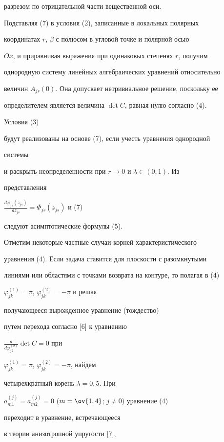 разрезом по отрицательной части вещественной оси. 


 


Подставляя (7) в условия (2), записанные в локальных полярных 


координатах $r$, $\beta$ с полюсом в угловой точке и полярной осью 


$O x$, и приравнивая выражения при одинаковых степенях $r$, получим 


однородную систему линейных алгебраических уравнений относительно 


величин $A_{js}(0)$. Она допускает нетривиальное решение, поскольку ее 


определителем является величина $\det C$, равная нулю согласно (4). 


Условия (3) 


будут реализованы на основе (7), если учесть уравнения однородной 


системы 


и раскрыть неопределенности при $r\to0$ и $\lambda\in(0,1)$. Из 


представления 


$\frac{d\varphi_{js}(z_{js})}{d z_{js}}=\Phi_{js}(z_{js})$ и (7) 


следуют асимптотические формулы (5). 


 


Отметим некоторые частные случаи корней характеристического 


уравнения (4). Если задача ставится для плоскости с разомкнутыми 


линиями или областями с точками возврата на контуре, то полагая в (4) 


$\varphi^{(1)}_{jk}=\pi$, $\varphi^{(2)}_{jk}=-\pi$ и решая 


получающееся вырожденное уравнение (тождество) 


путем перехода согласно [6] к уравнению 


$\frac{d}{d\varphi^{(2)}_{jk}}\det C=0$ при 


$\varphi^{(1)}_{jk}=\pi$, $\varphi^{(2)}_{jk}=-\pi$, найдем 


четырехкратный корень $\lambda=0,5$. При 


$a^{(j)}_{m1}=a^{(j)}_{m2}=0$ ($m=\ov{1,4}$; $j\ne0$) уравнение (4) 


переходит в уравнение, встречающееся 


в теории анизотропной упругости [7], 


